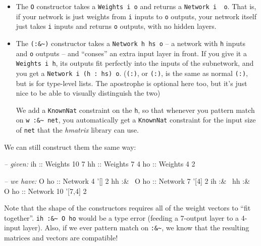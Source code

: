 \documentclass[]{article}
\newenvironment{Shaded}{}{}
\newcommand{\DataTypeTok}[1]{\textcolor[rgb]{0.56,0.13,0.00}{{#1}}}
\newcommand{\DecValTok}[1]{\textcolor[rgb]{0.25,0.63,0.44}{{#1}}}
\newcommand{\CharTok}[1]{\textcolor[rgb]{0.25,0.44,0.63}{{#1}}}
\newcommand{\CommentTok}[1]{\textcolor[rgb]{0.38,0.63,0.69}{\textit{{#1}}}}
\newcommand{\OtherTok}[1]{\textcolor[rgb]{0.00,0.44,0.13}{{#1}}}
\newcommand{\FunctionTok}[1]{\textcolor[rgb]{0.02,0.16,0.49}{{#1}}}
\newcommand{\NormalTok}[1]{{#1}}
\begin{document}
\begin{itemize}
\item
  The \texttt{O} constructor takes a \texttt{Weights\ i\ o} and returns a
  \texttt{Network\ i\ \textquotesingle{}{[}{]}\ o}. That is, if your network is
  just weights from \texttt{i} inputs to \texttt{o} outputs, your network itself
  just takes \texttt{i} inputs and returns \texttt{o} outputs, with no hidden
  layers.
\item
  The \texttt{(:\&\textasciitilde{})} constructor takes a
  \texttt{Network\ h\ hs\ o} -- a network with \texttt{h} inputs and \texttt{o}
  outputs -- and ``conses'' an extra input layer in front. If you give it a
  \texttt{Weights\ i\ h}, its outputs fit perfectly into the inputs of the
  subnetwork, and you get a
  \texttt{Network\ i\ (h\ \textquotesingle{}:\ hs)\ o}.
  (\texttt{(\textquotesingle{}:)}, or \texttt{(:)}, is the same as normal
  \texttt{(:)}, but is for type-level lists. The apostrophe is optional here
  too, but it's just nice to be able to visually distinguish the two)

  We add a \texttt{KnownNat} constraint on the \texttt{h}, so that whenever you
  pattern match on \texttt{w\ :\&\textasciitilde{}\ net}, you automatically get
  a \texttt{KnownNat} constraint for the input size of \texttt{net} that the
  \emph{hmatrix} library can use.
\end{itemize}

We can still construct them the same way:

\begin{Shaded}
\begin{Highlighting}[]
\CommentTok{-- given:}
\OtherTok{ih ::} \DataTypeTok{Weights} \DecValTok{10} \DecValTok{7}
\OtherTok{hh ::} \DataTypeTok{Weights}  \DecValTok{7} \DecValTok{4}
\OtherTok{ho ::} \DataTypeTok{Weights}  \DecValTok{4} \DecValTok{2}

\CommentTok{-- we have:}
              \DataTypeTok{O}\OtherTok{ ho ::} \DataTypeTok{Network}  \DecValTok{4} \CharTok{'[] 2}
       \NormalTok{hh }\FunctionTok{:&~} \DataTypeTok{O}\OtherTok{ ho ::} \DataTypeTok{Network}  \DecValTok{7} \CharTok{'[4] 2}
\NormalTok{ih }\FunctionTok{:&~} \NormalTok{hh }\FunctionTok{:&~} \DataTypeTok{O}\OtherTok{ ho ::} \DataTypeTok{Network} \DecValTok{10} \CharTok{'[7,4] 2}
\end{Highlighting}
\end{Shaded}

Note that the shape of the constructors requires all of the weight vectors to
``fit together''. \texttt{ih\ :\&\textasciitilde{}\ O\ ho} would be a type error
(feeding a 7-output layer to a 4-input layer). Also, if we ever pattern match on
\texttt{:\&\textasciitilde{}}, we know that the resulting matrices and vectors
are compatible!
\end{document}
